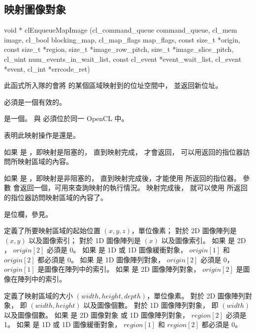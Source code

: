 \subsection{映射圖像對象}


\startCLFUNC
void * clEnqueueMapImage (cl_command_queue command_queue,
			cl_mem image,
			cl_bool blocking_map,
			cl_map_flags map_flags,
			const size_t *origin,
			const size_t *region,
			size_t *image_row_pitch,
			size_t *image_slice_pitch,
			cl_uint num_events_in_wait_list,
			const cl_event *event_wait_list,
			cl_event *event,
			cl_int *errcode_ret)
\stopCLFUNC

此函式所入隊的會將  的某個區域映射到的位址空間中，
並返回新位址。

 必須是一個有效的。

 是一個。
 與  必須位於同一 OpenCL 中。

 表明此映射操作是{}還是{}。

如果  是 ，即映射是阻塞的，
直到映射完成，  才會返回，
可以用返回的指位器訪問所映射區域的內容。

如果  是 ，即映射是非阻塞的，
直到映射完成後，才能使用  所返回的指位器。
參數  會返回一個，可用來查詢映射的執行情況。
映射完成後，
就可以使用  所返回的指位器訪問映射區域的內容了。

 是位欄，參見。

 定義了所要映射區域的起始位置 $(x, y, z)$，單位像素；
對於 2D 圖像陣列是 $(x, y)$ 以及圖像索引；
對於 1D 圖像陣列是 $(x)$ 以及圖像索引。
如果  是 2D ， $origin[2]$ 必須是 0。
如果  是 1D 或 1D 圖像緩衝對象，
$origin[1]$ 和 $origin[2]$ 都必須是 0。
如果  是 1D 圖像陣列對象， $origin[2]$ 必須是 0，
$origin[1]$ 是圖像在陣列中的索引。
如果  是 2D 圖像陣列對象， $origin[2]$ 是圖像在陣列中的索引。

 定義了映射區域的大小 $(width, height, depth)$，單位像素。
對於 2D 圖像陣列對象， 即 $(width, height)$ 以及圖像個數。
對於 1D 圖像陣列對象， 即 $(width)$ 以及圖像個數。
如果  是 2D 圖像對象 或 1D 圖像陣列對象， $region[2]$ 必須是 1。
如果  是 1D 或 1D 圖像緩衝對象，
$region[1]$ 和 $region[2]$ 都必須是 0。

